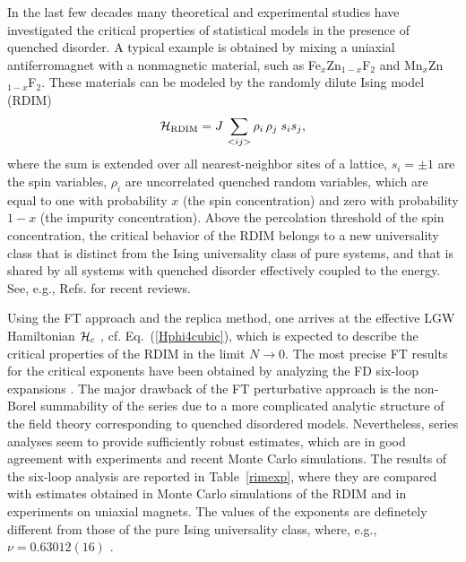 \documentclass[a4paper,12pt]{article}
\begin{document}
In the last few decades many theoretical and experimental
studies have investigated the critical properties
of statistical models in the presence of quenched disorder.
A typical example is obtained by mixing a
uniaxial antiferromagnet with a nonmagnetic material,
such as Fe$_x$Zn$_{1-x}$F$_2$ and Mn$_x$Zn$_{1-x}$F$_2$.
These materials can be modeled by the randomly dilute Ising model (RDIM)
\begin{equation}
{\cal H}_{\rm RDIM} = J\,\sum_{<ij>}  \rho_i \,\rho_j \; s_i s_j,
\label{latticeH}
\end{equation}
where the sum is extended over all nearest-neighbor sites of a 
lattice,
$s_i=\pm 1$ are the spin variables,
$\rho_i$ are uncorrelated quenched random variables, which are equal to one 
with probability $x$ (the spin concentration) and zero with probability $1-x$
(the impurity concentration). 
Above the percolation threshold of the spin concentration,
the critical behavior of the RDIM belongs to a new 
universality class that is distinct from the Ising universality class
of pure systems, and that is shared by all systems with quenched
disorder effectively coupled to the energy.
See, e.g., Refs. \cite{Belanger-00,FHY-01,review} for recent reviews.

Using the FT approach and the replica method, one arrives at
the effective LGW Hamiltonian ${\cal H}_c$ \cite{GL-76}, 
cf. Eq.~(\ref{Hphi4cubic}),
which is expected to describe the critical properties of the RDIM
in the limit $N\rightarrow 0$.
The most precise FT results for the critical exponents
have been obtained by analyzing the FD six-loop expansions \cite{PV-00,PS-00}.
The major drawback of the FT perturbative approach is the non-Borel summability 
of the series due to a more complicated analytic structure of the field theory  
corresponding to quenched disordered models. 
Nevertheless, series analyses seem to provide 
sufficiently robust estimates, which are in good agreement 
with experiments and recent Monte Carlo simulations.
The results of the six-loop analysis 
are reported in Table~\ref{rimexp}, where they are 
compared with estimates obtained in Monte Carlo simulations of the RDIM 
and in experiments on uniaxial magnets.
The values of the exponents are definetely different
from those of the pure Ising universality class, where, e.g.,
$\nu=0.63012(16)$ \cite{CPRV-ising}.
\end{document}
